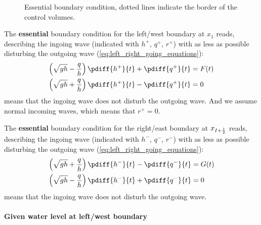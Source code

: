 \begin{figure}[H]
    \begin{center}
        \def\svgwidth{0.80\textwidth} %
        \resizebox{0.65\textwidth}{!}{
            
        }
    \end{center}
    \caption{Essential boundary condition, dotted lines indicate the border of the control volumes.}    \label{fig:structured_grid_along_straight_boundary_essential}
\end{figure}
The \textbf{essential} boundary condition for the left/west boundary at $x_{1}$ reads, describing the ingoing wave (indicated with $h^+$, $q^+$, $r^+$) with as less as possible disturbing the outgoing wave (\autoref{eq:left_right_going_equations}):
\begin{align}
    \left(\sqrt{gh} - \frac{q}{h}\right) \pdiff{h^{+}}{t} + \pdiff{q^{+}}{t} & = F(t)
    \label{eq:essential_conv_2d_1}
    \\
    \left(\sqrt{gh} + \frac{q}{h}\right) \pdiff{h^{+}}{t} - \pdiff{q^{+}}{t} & = 0
    \label{eq:essential_conv_2d_2}
\end{align}
 means that the ingoing wave does not disturb the outgoing wave.
And we assume normal incoming waves, which means that $r^+=0$.

The \textbf{essential} boundary condition for the right/east boundary at $x_{I+\frac{1}{2}}$ reads, describing the ingoing wave (indicated with $h^-$, $q^-$, $r^-$) with as less as possible disturbing the outgoing wave (\autoref{eq:left_right_going_equations}):\begin{align}
    \left(\sqrt{gh} + \frac{q}{h}\right) \pdiff{h^{-}}{t} - \pdiff{q^{-}}{t} & = G(t)
    \label{eq:essential_conv_2d_3}
    \\
    \left(\sqrt{gh} - \frac{q}{h}\right) \pdiff{h^{-}}{t} + \pdiff{q^{-}}{t} & = 0
    \label{eq:essential_conv_2d_4}
\end{align}
 means that the ingoing wave does not disturb the outgoing wave.
\paragraph*{Given water level at left/west boundary}


